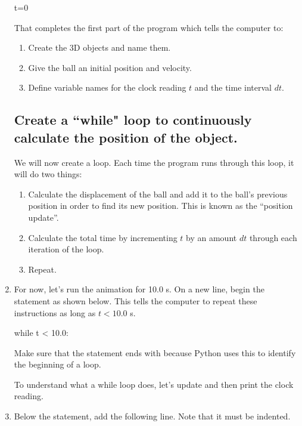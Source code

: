 \begin{enumerate}
\begin{myvpython}
t=0
\end{myvpython}

That completes the first part of the program which tells the computer to:

	\begin{enumerate}
		\item Create the 3D objects and name them.
		\item Give the ball an initial position and velocity.
		\item Define variable names for the clock reading $t$ and the time interval $dt$.
	\end{enumerate}
	
\subsection*{Create a ``while" loop to continuously calculate the position of the object.}

We will now create a  loop. Each time the program runs through this loop, it will do two things:

	\begin{enumerate}
		\item Calculate the displacement of the ball and add it to the ball's previous position in order to find its new position. This is known as the ``position update''.
		\item Calculate the total time by incrementing $t$ by an amount $dt$ through each iteration of the loop.
		\item Repeat.
	\end{enumerate}

	\item For now, let's run the animation for 10.0 s. On a new line, begin the  statement as shown below. This tells the computer to repeat these instructions as long as $t < 10.0$ s.
	
\begin{myvpython}
while t < 10.0:
\end{myvpython}
	
	Make sure that the  statement ends with \type{:} because Python uses this to identify the beginning of a loop. 
	
	To understand what a while loop does, let's update and then  print the clock reading.

\item Below the  statement, add the following line. Note that it must be indented.


\end{enumerate}
